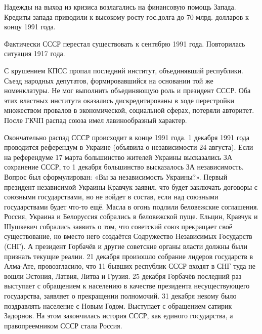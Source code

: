 Надежды на выход из кризиса возлагались на финансовую помощь Запада. Кредиты запада приводили к высокому росту гос.долга до 70 млрд. долларов к концу 1991 года.

Фактически СССР перестал существовать к сентябрю 1991 года. Повторилась ситуация 1917 года.

С крушением КПСС пропал последний институт, объединявший республики. Съезд народных депутатов, формировавшийся на основании той же номенклатуры. Не мог выполнить объединяющую роль и президент СССР. Оба этих властных института оказались дискредитированы в ходе перестройки множеством провалов в экономической, социальной сферах, потеряли авторитет.
После ГКЧП распад союза имел лавинообразный характер.

Окончательно распад СССР происходит в конце 1991 года. 1 декабря 1991 года проводится референдум в Украине (объявила о независимости 24 августа). Если на референдуме 17 марта большинство жителей Украины высказались ЗА сохранение СССР, то 1 декабря большинство высказалось ЗА независимость. Вопрос был сформулирован: «Вы за независимость Украины?». Первый президент независимой Украины Кравчук заявил, что будет заключать договоры с союзными государствами, но не войдет в состав, если над союзными государствами будет что-то ещё. 
Масла в огонь подлили беловежские соглашения. Россия, Украина и Белоруссия собрались в беловежской пуще. Ельцин, Кравчук и Шушкевич собрались заявить о том, что советский союз прекращает своё существование, но вместо него создаётся Содружество Независимых Государств (СНГ). А президент Горбачёв и другие советские органы власти должны были признать текущие реалии. 
21 декабря произошло собрание лидеров государств в Алма-Ате, провозгласило, что 11 бывших республик СССР входят в СНГ туда не вошли Эстония, Латвия, Литва и Грузия. 25 декабря Горбачёв последний раз выступает с обращением к населению в качестве президента несуществующего государства, заявляет о прекращении полномочий. 31 декабря некому было поздравлять население с Новым Годом. Выступает с обращением сатирик Задорнов. На этом закончилась история СССР, как единого государства, а правопреемником СССР стала Россия.
